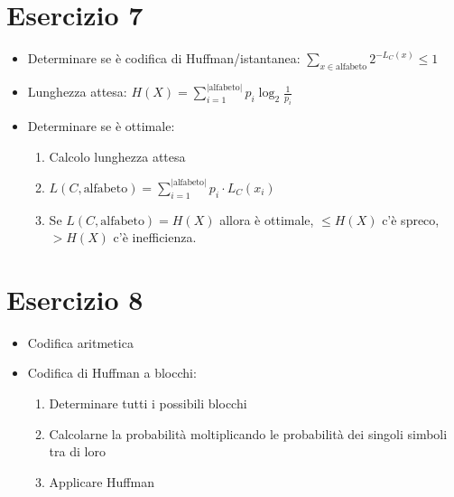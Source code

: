 \documentclass[12pt]{article}
\begin{document}
\section{Esercizio 7}
\begin{itemize}
    \item Determinare se è codifica di Huffman/istantanea: $\sum_{x\in\text{alfabeto}}2^{-L_{C}(x)}\leq 1$
    \item Lunghezza attesa: $H(X)=\sum_{i=1}^{|\text{alfabeto}|}p_{i}\log_{2}\frac{1}{p_{i}}$
    \item Determinare se è ottimale: \begin{enumerate}
        \item Calcolo lunghezza attesa
        \item $L(C,\text{alfabeto})=\sum_{i=1}^{|\text{alfabeto}|} p_{i}\cdot L_{C}(x_{i})$
        \item Se $L(C,\text{alfabeto}) = H(X)$ allora è ottimale, $\leq H(X)$ c'è spreco, $> H(X)$ c'è inefficienza.
    \end{enumerate}
\end{itemize}
\section{Esercizio 8}
\begin{itemize}
    \item Codifica aritmetica
    \item Codifica di Huffman a blocchi: \begin{enumerate}
        \item Determinare tutti i possibili blocchi
        \item Calcolarne la probabilità moltiplicando le probabilità dei singoli simboli tra di loro
        \item Applicare Huffman
    \end{enumerate}
\end{itemize}
\end{document}

